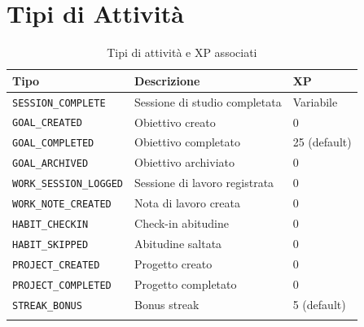 \documentclass[11pt,a4paper]{article}
\begin{document}
\section{Tipi di Attività}

\begin{longtable}{@{}lp{8cm}l@{}}
\toprule
\textbf{Tipo} & \textbf{Descrizione} & \textbf{XP} \\
\midrule
\texttt{SESSION\_COMPLETE} & Sessione di studio completata & Variabile \\
\texttt{GOAL\_CREATED} & Obiettivo creato & 0 \\
\texttt{GOAL\_COMPLETED} & Obiettivo completato & 25 (default) \\
\texttt{GOAL\_ARCHIVED} & Obiettivo archiviato & 0 \\
\texttt{WORK\_SESSION\_LOGGED} & Sessione di lavoro registrata & 0 \\
\texttt{WORK\_NOTE\_CREATED} & Nota di lavoro creata & 0 \\
\texttt{HABIT\_CHECKIN} & Check-in abitudine & 0 \\
\texttt{HABIT\_SKIPPED} & Abitudine saltata & 0 \\
\texttt{PROJECT\_CREATED} & Progetto creato & 0 \\
\texttt{PROJECT\_COMPLETED} & Progetto completato & 0 \\
\texttt{STREAK\_BONUS} & Bonus streak & 5 (default) \\
\bottomrule
\caption{Tipi di attività e XP associati}
\end{longtable}
\end{document}
